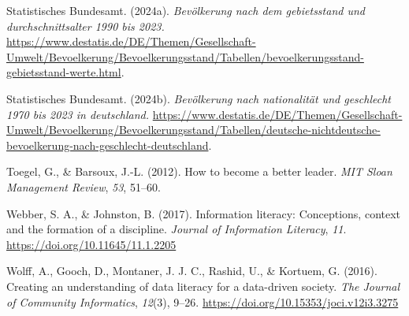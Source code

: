 \documentclass[
  12pt,
  a4paper,
  twoside]{article}
\newlength{\cslhangindent}
\newenvironment{CSLReferences}[2] %
 {\begin{list}{}{%
  \setlength{\itemindent}{0pt}
  \setlength{\leftmargin}{0pt}
  \setlength{\parsep}{0pt}
  \ifodd #1
   \setlength{\leftmargin}{\cslhangindent}
   \setlength{\itemindent}{-1\cslhangindent}
  \fi
  \setlength{\itemsep}{#2\baselineskip}}}
 {\end{list}}
\begin{document}
\begin{CSLReferences}{1}{0}
Statistisches Bundesamt. (2024a). \emph{Bevölkerung nach dem gebietsstand und durchschnitts­alter 1990 bis 2023.} \url{https://www.destatis.de/DE/Themen/Gesellschaft-Umwelt/Bevoelkerung/Bevoelkerungsstand/Tabellen/bevoelkerungsstand-gebietsstand-werte.html}.

Statistisches Bundesamt. (2024b). \emph{Bevölkerung nach nationalität und geschlecht 1970 bis 2023 in deutschland.} \url{https://www.destatis.de/DE/Themen/Gesellschaft-Umwelt/Bevoelkerung/Bevoelkerungsstand/Tabellen/deutsche-nichtdeutsche-bevoelkerung-nach-geschlecht-deutschland}.

Toegel, G., \& Barsoux, J.-L. (2012). How to become a better leader. \emph{MIT Sloan Management Review}, \emph{53}, 51--60.

Webber, S. A., \& Johnston, B. (2017). Information literacy: Conceptions, context and the formation of a discipline. \emph{Journal of Information Literacy}, \emph{11}. \url{https://doi.org/10.11645/11.1.2205}

Wolff, A., Gooch, D., Montaner, J. J. C., Rashid, U., \& Kortuem, G. (2016). Creating an understanding of data literacy for a data-driven society. \emph{The Journal of Community Informatics}, \emph{12}(3), 9--26. \url{https://doi.org/10.15353/joci.v12i3.3275}

\end{CSLReferences}
\end{document}
